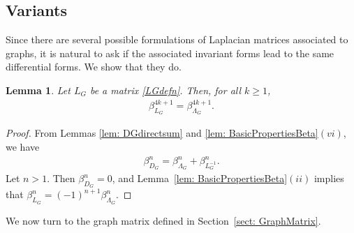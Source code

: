 \documentclass[pdftex]{sigma}%
\newtheorem{lem}[thm]{Lemma}
\numberwithin{equation}{section}
\newcommand{\0}{\color{blue}{\mathsf{0}}}
\begin{document}
\subsection{Variants} Since there are several possible formulations of Laplacian matrices associated to graphs, it is natural to ask if the associated invariant forms lead to the same differential forms. We show that they do.

\begin{lem} \label{lem: betaviaLG} Let $L_G$ be a matrix \eqref{LGdefn}. Then, for all $k\geq 1$,
\begin{gather*}
\beta^{4k+1}_{L_G} = \beta^{4k+1}_{\Lambda_G} .
\end{gather*}
\end{lem}
\begin{proof}
From Lemmas \ref{lem: DGdirectsum} and \ref{lem: BasicPropertiesBeta}$(vi)$, we have
\begin{gather*}
\beta_{D_G}^n = \beta_{\Lambda_G}^n + \beta^n_{L_G^{-1}}.
\end{gather*}
Let $n>1$. Then $\beta_{D_G}^n=0$, and Lemma~\ref{lem: BasicPropertiesBeta}$(ii)$ implies that
$\beta^n_{L_G} = (-1)^{n+1} \beta^n_{\Lambda_G}$.
\end{proof}

We now turn to the graph matrix defined in Section~\ref{sect: GraphMatrix}.
\end{document}
